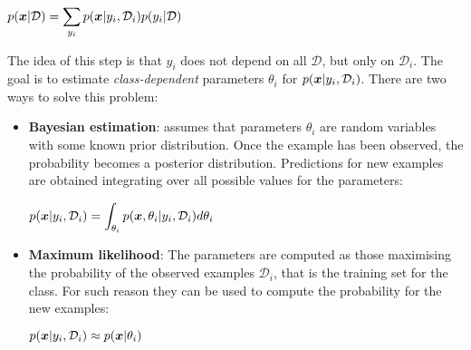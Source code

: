 \begin{center}
	$\displaystyle p(\bm{x}\vert \mathcal{D})=\displaystyle\sum_{y_i}p(\bm{x}\vert y_i,\mathcal{D}_i)p(y_i\vert \mathcal{D})$
\end{center}
The idea of this step is that $y_i$ does not depend on all $\mathcal{D}$, but only on $\mathcal{D}_i$.\newline
The goal is to estimate \textit{class-dependent} parameters $\theta_i$ for $\displaystyle p(\bm{x}\vert y_i,\mathcal{D}_i)$. There are two ways to solve this problem:
\begin{itemize}
	\item \textbf{Bayesian estimation}: assumes that parameters $\theta_i$ are random variables with some known prior distribution. Once the example has been observed, the probability becomes a posterior distribution. Predictions for new examples are obtained integrating over all possible values for the parameters:
		\begin{center}
			$\displaystyle p(\bm{x}\vert y_i,\mathcal{D}_i)=\int_{\theta_i}p(\bm{x},\theta_i\vert y_i,\mathcal{D}_i)d\theta_i$
		\end{center}
	\item \textbf{Maximum likelihood}: The parameters are computed as those maximising the probability of the observed examples $\mathcal{D}_i$, that is the training set for the class. For such reason they can be used to compute the probability for the new examples:
		\begin{center}
			$\displaystyle p(\bm{x}\vert y_i,\mathcal{D}_i)\approx p(\bm{x}\vert\theta_i)$
		\end{center}
\end{itemize}
%
%
%
